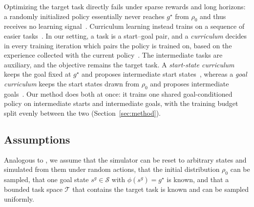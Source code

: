 Optimizing the target task directly fails under sparse rewards and long horizons: a randomly initialized policy essentially never reaches $g^\star$ from $\rho_0$ and thus receives no learning signal~\citep{florensa2017reverse}.
Curriculum learning instead trains on a sequence of easier tasks~\citep{narvekar2020curriculum, portelas2020automatic}. In our setting, a task is a start--goal pair, and a \emph{curriculum} decides in every training iteration which pairs the policy is trained on, based on the experience collected with the current policy~\citep{tao2024reverse}. The intermediate tasks are auxiliary, and the objective remains the target task.
A \emph{start-state curriculum} keeps the goal fixed at $g^\star$ and proposes intermediate start states~\citep{florensa2017reverse, tao2024reverse}, whereas a \emph{goal curriculum} keeps the start states drawn from $\rho_0$ and proposes intermediate goals~\citep{florensa2018automatic, ren2019exploration}. Our method does both at once: it trains one shared goal-conditioned policy on intermediate starts and intermediate goals, with the training budget split evenly between the two (Section~\ref{sec:method}).

\subsection{Assumptions}\label{sec:assumptions}

Analogous to \citet{florensa2017reverse}, we assume that the simulator can be reset to arbitrary states and simulated from them under random actions, that the initial distribution $\rho_0$ can be sampled, that one goal state $s^{g} \in \mathcal{S}$ with $\phi(s^{g}) = g^\star$ is known, and that a bounded task space $\mathcal{T}$ that contains the target task is known and can be sampled uniformly.
